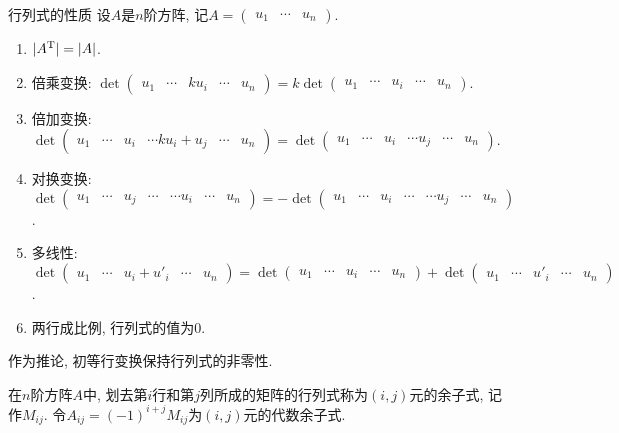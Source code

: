 \begin{proposition}{行列式的性质}
	设$A$是$n$阶方阵, 记$A=\begin{pmatrix}
		u_1 & \cdots & u_n
	\end{pmatrix}$. 
	\begin{enumerate}
		\item $|A^{\operatorname{T}}| = |A|$. 
		\item 倍乘变换: $\det \begin{pmatrix}
		u_1 & \cdots & ku_i & \cdots & u_n
	\end{pmatrix} = k \det \begin{pmatrix}
		u_1 & \cdots & u_i & \cdots & u_n
	\end{pmatrix}$. 
		\item 倍加变换: $\det \begin{pmatrix}
		u_1 & \cdots & u_i & \cdots ku_i+u_j & \cdots & u_n
	\end{pmatrix} = \det \begin{pmatrix}
		u_1 & \cdots & u_i & \cdots u_j & \cdots & u_n
	\end{pmatrix}$. 
		\item 对换变换: $\det \begin{pmatrix}
		u_1 & \cdots & u_j & \cdots & \cdots u_i & \cdots & u_n
	\end{pmatrix} = -\det \begin{pmatrix}
		u_1 & \cdots & u_i & \cdots & \cdots u_j & \cdots & u_n
	\end{pmatrix}$. 
		\item 多线性: $\det \begin{pmatrix}
			u_1 & \cdots & u_i+u'_i & \cdots & u_n
		\end{pmatrix} = \det \begin{pmatrix}
			u_1 & \cdots & u_i & \cdots & u_n
		\end{pmatrix} + \det \begin{pmatrix}
			u_1 & \cdots & u'_i & \cdots & u_n
		\end{pmatrix}$. 
		\item 两行成比例, 行列式的值为$0$. 
	\end{enumerate}
\end{proposition}
\begin{remark}
	作为推论, 初等行变换保持行列式的非零性. 
\end{remark}

在$n$阶方阵$A$中, 划去第$i$行和第$j$列所成的矩阵的行列式称为$(i,j)$元的余子式, 记作$M_{ij}$. 令$A_{ij}=(-1)^{i+j}M_{ij}$为$(i,j)$元的代数余子式. 

